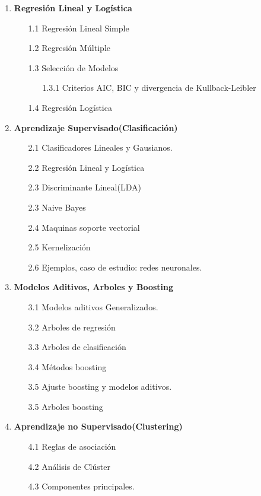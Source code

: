 \documentclass[11pt]{report}
\begin{document}
\begin{enumerate}
\item \textbf{Regresión Lineal y Logística} 
\begin{itemize}

\item[1.1] Regresión Lineal Simple 
\item[1.2] Regresión Múltiple 
\item[1.3] Selección de Modelos 
\begin{itemize}
\item[1.3.1] Criterios AIC, BIC y divergencia de Kullback-Leibler
\end{itemize}
\item[1.4] Regresión Logística   
\end{itemize}


\item  \textbf{Aprendizaje Supervisado(Clasificación)}
\begin{itemize}
\item[2.1] Clasificadores Lineales y Gausianos. 
\item[2.2] Regresión Lineal y Logística 
\item[2.3] Discriminante Lineal(LDA) 
\item[2.3] Naive Bayes
\item[2.4] Maquinas soporte vectorial
\item[2.5] Kernelización
\item[2.6] Ejemplos, caso de estudio: redes neuronales.
\end{itemize}


\item \textbf{Modelos Aditivos, Arboles y Boosting}
\begin{itemize}
\item[3.1] Modelos aditivos Generalizados.
\item[3.2] Arboles de regresión
\item[3.3] Arboles de clasificación
\item[3.4] Métodos boosting 
\item[3.5] Ajuste boosting y modelos aditivos. 
\item[3.5] Arboles boosting
\end{itemize}


\item  \textbf{Aprendizaje no Supervisado(Clustering)}
\begin{itemize}
\item[4.1] Reglas de asociación
\item[4.2] Análisis de Clúster
\item[4.3] Componentes principales.
\end{itemize}





\end{enumerate}
\end{document}
